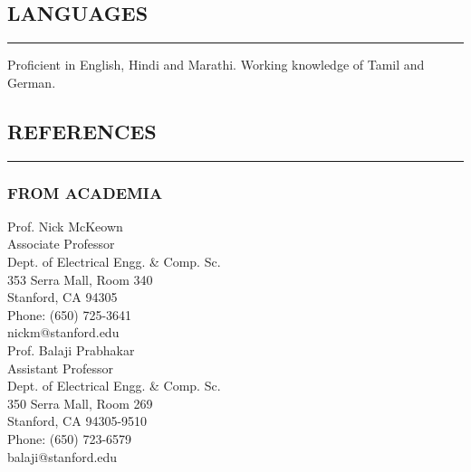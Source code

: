 \documentclass[10pt,a4]{article}
\begin{document}
\begin{small}
\subsection*{LANGUAGES}
\hrule
\vspace{0.2cm}
\begin{list}{}{}
	\item  Proficient in English, Hindi and Marathi. Working knowledge of Tamil and German.
\end{list}


\vspace{0.1cm}

\subsection*{REFERENCES}
\hrule
\vspace{0.2cm}


\subsubsection*{FROM ACADEMIA}
\begin{footnotesize}

\begin{multicols}{2} 
\noindent 
Prof. Nick McKeown \\
Associate Professor \\
Dept. of Electrical Engg. \& Comp. Sc. \\
353 Serra Mall, Room 340 \\
Stanford, CA 94305 \\
Phone: (650) 725-3641 \\
nickm@stanford.edu \\

\noindent
Prof. Balaji Prabhakar\\
Assistant Professor \\
Dept. of Electrical Engg. \& Comp. Sc. \\
350 Serra Mall, Room 269 \\
Stanford, CA 94305-9510 \\
Phone: (650) 723-6579 \\
balaji@stanford.edu \\


\end{multicols}
\end{footnotesize}
\end{small}
\end{document}
